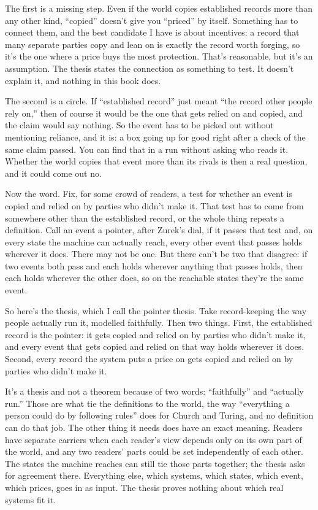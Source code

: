 \documentclass[11pt,twoside]{article}
\theoremstyle{thielethm}
\theoremstyle{thieledef}
\theoremstyle{thieledef}
\theoremstyle{thieledef}
\theoremstyle{thielethm}
\theoremstyle{thieleobs}
\theoremstyle{thielethm}
\begin{document}
The first is a missing step. Even if the world copies established records more than any other kind, ``copied'' doesn't give you ``priced'' by itself. Something has to connect them, and the best candidate I have is about incentives: a record that many separate parties copy and lean on is exactly the record worth forging, so it's the one where a price buys the most protection. That's reasonable, but it's an assumption. The thesis states the connection as something to test. It doesn't explain it, and nothing in this book does.

The second is a circle. If ``established record'' just meant ``the record other people rely on,'' then of course it would be the one that gets relied on and copied, and the claim would say nothing. So the event has to be picked out without mentioning reliance, and it is: a box going up for good right after a check of the same claim passed. You can find that in a run without asking who reads it. Whether the world copies that event more than its rivals is then a real question, and it could come out no.

Now the word. Fix, for some crowd of readers, a test for whether an event is copied and relied on by parties who didn't make it. That test has to come from somewhere other than the established record, or the whole thing repeats a definition. Call an event a pointer, after Zurek's dial, if it passes that test and, on every state the machine can actually reach, every other event that passes holds wherever it does. There may not be one. But there can't be two that disagree: if two events both pass and each holds wherever anything that passes holds, then each holds wherever the other does, so on the reachable states they're the same event.

So here's the thesis, which I call the pointer thesis. Take record-keeping the way people actually run it, modelled faithfully. Then two things. First, the established record is the pointer: it gets copied and relied on by parties who didn't make it, and every event that gets copied and relied on that way holds wherever it does. Second, every record the system puts a price on gets copied and relied on by parties who didn't make it.

It's a thesis and not a theorem because of two words: ``faithfully'' and ``actually run.'' Those are what tie the definitions to the world, the way ``everything a person could do by following rules'' does for Church and Turing, and no definition can do that job. The other thing it needs does have an exact meaning. Readers have separate carriers when each reader's view depends only on its own part of the world, and any two readers' parts could be set independently of each other. The states the machine reaches can still tie those parts together; the thesis asks for agreement there. Everything else, which systems, which states, which event, which prices, goes in as input. The thesis proves nothing about which real systems fit it.
\end{document}
